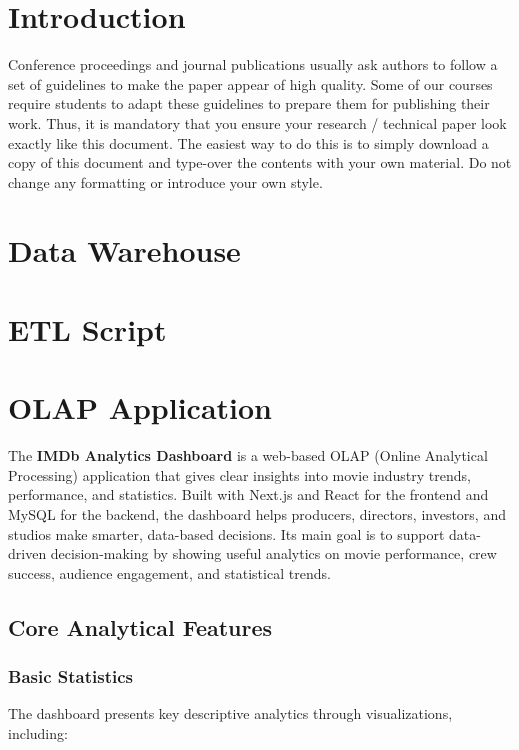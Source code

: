 \documentclass[sigconf, pbalance]{acmart}
\begin{document}
\section{Introduction}

Conference proceedings and journal publications usually ask authors to follow a set of guidelines to make the paper appear of high quality. Some of our courses require students to adapt these guidelines to prepare them for publishing their work. Thus, it is mandatory that you ensure your research / technical paper look exactly like this document. The easiest way to do this is to simply download a copy of this document and type-over the contents with your own material. Do not change any formatting or introduce your own style.


\section{Data Warehouse}

\section{ETL Script}

\section{OLAP Application}

The \textbf{IMDb Analytics Dashboard} is a web-based OLAP (Online Analytical Processing) application that gives clear insights into movie industry trends, performance, and statistics. Built with Next.js and React for the frontend and MySQL for the backend, the dashboard helps producers, directors, investors, and studios make smarter, data-based decisions. Its main goal is to support data-driven decision-making by showing useful analytics on movie performance, crew success, audience engagement, and statistical trends.

\subsection{Core Analytical Features}

\subsubsection{Basic Statistics}

The dashboard presents key descriptive analytics through  visualizations, including:
\end{document}
